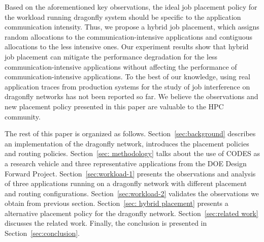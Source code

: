 Based on the aforementioned key observations, the ideal job placement policy for the workload running dragonfly system should be specific to the application communication intensity. Thus, we propose a hybrid job placement, which assigns random allocations to the communication-intensive applications and contiguous allocations to the less intensive ones. Our experiment results show that hybrid job placement can mitigate the performance degradation for the less communication-intensive applications without affecting the performance of communication-intensive applications.
To the best of our knowledge, using real application traces from production systems for the study of job interference on dragonfly networks has not been reported so far. We believe the observations and new placement policy presented in this paper are valuable to the HPC community.


The rest of this paper is organized as follows. Section~\ref{sec:background} describes an implementation of the dragonfly network, introduces the placement policies and routing policies. Section~\ref{sec: methodology} talks about the use of CODES as a research vehicle and three representative applications from the DOE Design Forward Project. Section~\ref{sec:workload-1} presents the observations and analysis of three applications running on a dragonfly network with different placement and routing configurations. Section~\ref{sec:workload-2} validates the observations we obtain from previous section. Section~\ref{sec: hybrid placement} presents a alternative placement policy for the dragonfly network. Section~\ref{sec:related work} discusses the related work. Finally, the conclusion is presented in Section~\ref{sec:conclusion}.


